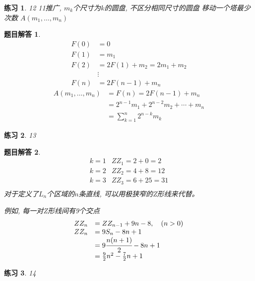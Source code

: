 \documentclass[mode=geye, chinesefont=founder]{elegantnote}
\newtheorem{exercise}{练习}
\newtheorem{answer}{题目解答}
\begin{document}
\begin{exercise}
	12 11推广,	$ m_k $个尺寸为$ k $的圆盘, 不区分相同尺寸的圆盘
	移动一个塔最少次数 $ A(m_1, \dots, m_n) $
\end{exercise}

\begin{answer}
	\begin{align*}
		F(0) 	&= 0	\\
		F(1) 	&= m_1	\\
		F(2) 	&= 2F(1)+m_2 = 2m_1+m_2	\\
				&\vdots	\\
		F(n)	&= 2F(n-1)+m_n
	\end{align*}
	\begin{align*}
		A(m_1, \dots, m_n) 
		&= F(n) = 2F(n-1)+m_n\\
		&= 2^{n-1}m_1+2^{n-2}m_2+\cdots+m_n\\
		&= \sum_{k=1}^{n} 2^{n-k} m_{k}
	\end{align*}
\end{answer}

\begin{exercise}
	13
\end{exercise}

\begin{answer}
	\begin{equation*}
		\begin{array}{ll}
			k=1 & ZZ_1 = 2+0 = 2\\
			k=2	& ZZ_2 = 4+8 = 12\\
			k=3	& ZZ_3 = 6+25 = 31\\
		\end{array}
	\end{equation*}
对于定义了$ L_n $个区域的$ n $条直线, 
可以用极狭窄的Z形线来代替。

例如, 每一对Z形线间有9个交点
\begin{equation}
	\begin{array}{ll}
		ZZ_n 	&= ZZ_{n-1}+9n-8,\quad (n>0)\\
		ZZ_n	&= 9S_n - 8n+1\\
				&= 9\cfrac{n(n+1)}{2} - 8n+1\\
				&= \frac{9}{2}n^2 - \frac{7}{2}n + 1\\
	\end{array}
\end{equation}
\end{answer}

\begin{exercise}
	14
\end{exercise}
\end{document}
